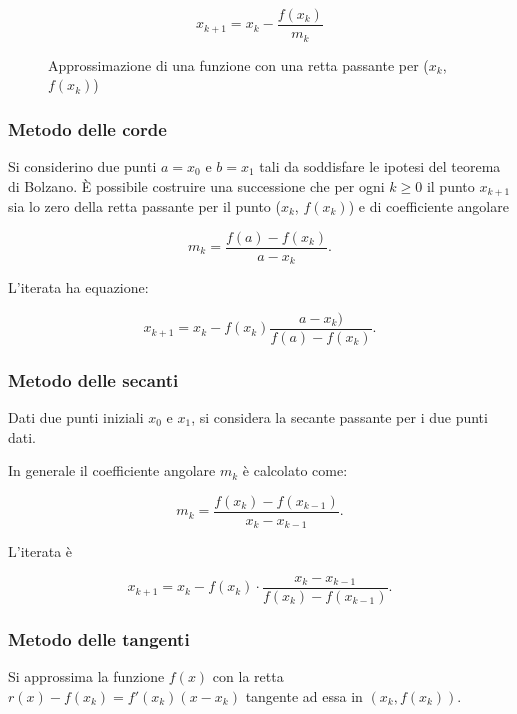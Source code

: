 \documentclass[10pt]{article}
\begin{document}
\begin{equation}
    x_{k+1} = x_k - \frac{f(x_k)}{m_k}
\end{equation}

\begin{figure}
    \begin{center}
        
        \caption{Approssimazione di una funzione con una retta passante per ($x_k$, $f(x_k)$)}
        \label{fig:retta_approx}
    \end{center}
\end{figure}


\subsubsection{Metodo delle corde}

Si considerino due punti $a=x_0$ e $b=x_1$ tali da soddisfare le ipotesi del teorema di Bolzano.
È possibile costruire una successione che per ogni $k \geq 0$  il punto $x_{k+1}$ sia lo zero della retta passante per il punto
($x_{k}$, $f(x_{k})$) e di coefficiente angolare

$$\displaystyle m_k = \frac{f(a)  - f(x_k)}{a - x_k}.$$

L'iterata ha equazione:

$$x_{k+1} = x_k - f(x_k) \frac{a  - x_k)}{f(a) - f(x_k)}.$$



\subsubsection{Metodo delle secanti}

Dati due punti iniziali $x_0$ e $x_1$, si considera la secante passante per i due punti dati.

In generale il coefficiente angolare $m_k$ è calcolato come:

$$m_k = \frac{f(x_k) - f(x_{k-1})}{x_k - x_{k-1}}.$$

L'iterata è

$$x_{k+1} = x_k - f(x_k) \cdot \frac{x_k - x_{k-1}}{f(x_k) - f(x_{k-1})}.$$

\subsubsection{Metodo delle tangenti}

Si approssima la funzione $f(x)$ con la retta $r(x) - f(x_k) = f'(x_k) (x - x_k)$ tangente ad essa in $(x_k, f(x_k))$.
\end{document}
